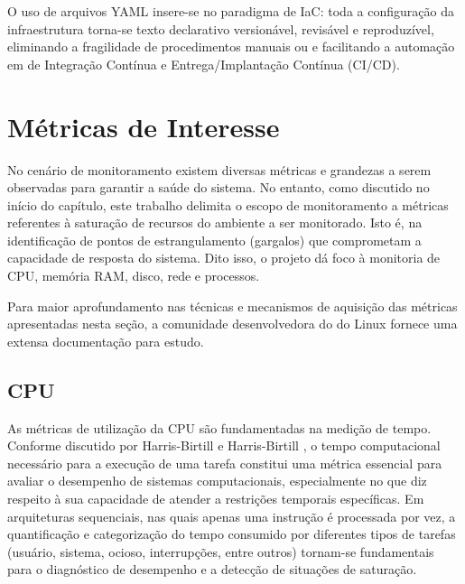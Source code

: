 O uso de arquivos YAML insere-se no paradigma de IaC: toda a configuração da infraestrutura torna-se texto declarativo versionável, revisável e reproduzível, eliminando a fragilidade de procedimentos manuais ou  e facilitando a automação em  de Integração Contínua e Entrega/Implantação Contínua (CI/CD).


\section{Métricas de Interesse}
\label{section:Metricas}

No cenário de monitoramento existem diversas métricas e grandezas a serem observadas para garantir a saúde do sistema. No entanto, como discutido no início do capítulo, este trabalho delimita o escopo de monitoramento a métricas referentes à saturação de recursos do ambiente a ser monitorado. Isto é, na identificação de pontos de estrangulamento (gargalos) que comprometam a capacidade de resposta do sistema. Dito isso, o projeto dá foco à monitoria de CPU, memória RAM, disco, rede e processos.

Para maior aprofundamento nas técnicas e mecanismos de aquisição das métricas apresentadas nesta seção, a comunidade desenvolvedora do  do Linux fornece uma extensa documentação \citep{linuxkernel2025} para estudo.


\subsection{CPU}
\label{subsection:CPU}

As métricas de utilização da CPU são fundamentadas na medição de tempo. Conforme discutido por Harris-Birtill e Harris-Birtill \citep{harris-birtill2021}, o tempo computacional necessário para a execução de uma tarefa constitui uma métrica essencial para avaliar o desempenho de sistemas computacionais, especialmente no que diz respeito à sua capacidade de atender a restrições temporais específicas. Em arquiteturas sequenciais, nas quais apenas uma instrução é processada por vez, a quantificação e categorização do tempo consumido por diferentes tipos de tarefas (usuário, sistema, ocioso, interrupções, entre outros) tornam-se fundamentais para o diagnóstico de desempenho e a detecção de situações de saturação.

